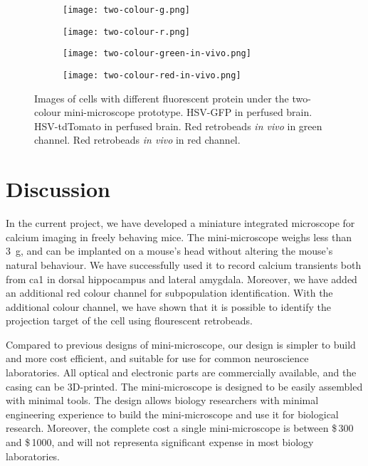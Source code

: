 \begin{figure}[h]
    \begin{subfigure}[t]{.5\linewidth}
        \texttt{[image: two-colour-g.png]}
        \caption{\label{f.twocolour.g}}
    \end{subfigure}
    \begin{subfigure}[t]{.5\linewidth}
        \texttt{[image: two-colour-r.png]}
        \caption{\label{f.twocolour.r}}
    \end{subfigure}
    \begin{subfigure}[t]{.5\linewidth}
        \texttt{[image: two-colour-green-in-vivo.png]}
        \caption{\label{f.twocolour.g.invivo}}
    \end{subfigure}
    \begin{subfigure}[t]{.5\linewidth}
        \texttt{[image: two-colour-red-in-vivo.png]}
        \caption{\label{f.twocolour.r.invivo}}
    \end{subfigure}

    \caption{Images of cells with different fluorescent protein under the two-colour mini-microscope prototype.  HSV-GFP in perfused brain.  HSV-tdTomato in perfused brain.  Red retrobeads \textit{in vivo} in green channel.  Red retrobeads \textit{in vivo} in red channel. \label{f.twocolour}}
\end{figure}

\section{Discussion}

In the current project, we have developed a miniature integrated microscope for calcium imaging in freely behaving mice. The mini-microscope weighs less than \SI{3}{\gram}, and can be implanted on a mouse's head without altering the mouse's natural behaviour. We have successfully used it to record calcium transients both from \gls{ca1} in dorsal hippocampus and lateral amygdala. Moreover, we have added an additional red colour channel for subpopulation identification. With the additional colour channel, we have shown that it is possible to identify the projection target of the cell using flourescent retrobeads. 

Compared to previous designs of mini-microscope, our design is simpler to build and more cost efficient, and suitable for use for common neuroscience laboratories. All optical and electronic parts are commercially available, and the casing can be 3D-printed. The mini-microscope is designed to be easily assembled with minimal tools. The design allows biology researchers with minimal engineering experience to build the mini-microscope and use it for biological research. Moreover, the complete cost a single mini-microscope is between \$\,300 and \$\,1000, and will not representa significant expense in most biology laboratories.

